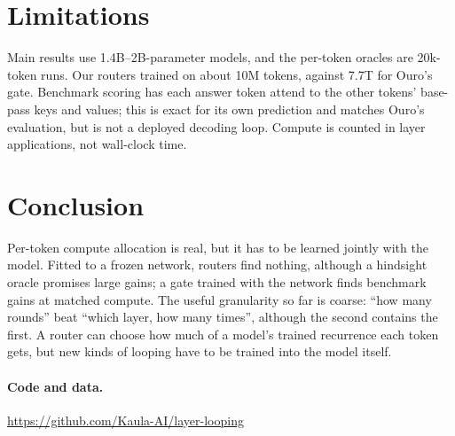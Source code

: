 \documentclass[11pt]{article}
\begin{document}
\section{Limitations}
Main results use 1.4B--2B-parameter models, and the per-token oracles are 20k-token runs. Our routers trained
on about 10M tokens, against 7.7T for Ouro's gate. Benchmark scoring has each answer token attend to the other
tokens' base-pass keys and values; this is exact for its own prediction and matches Ouro's evaluation, but is
not a deployed decoding loop. Compute is counted in layer applications, not wall-clock time.

\section{Conclusion}
Per-token compute allocation is real, but it has to be learned jointly with the model. Fitted to a frozen
network, routers find nothing, although a hindsight oracle promises large gains; a gate trained with the
network finds benchmark gains at matched compute. The useful granularity so far is coarse: ``how many rounds''
beat ``which layer, how many times'', although the second contains the first. A router can choose how much of
a model's trained recurrence each token gets, but new kinds of looping have to be trained into the model itself.

\paragraph{Code and data.} \url{https://github.com/Kaula-AI/layer-looping}



\end{document}
